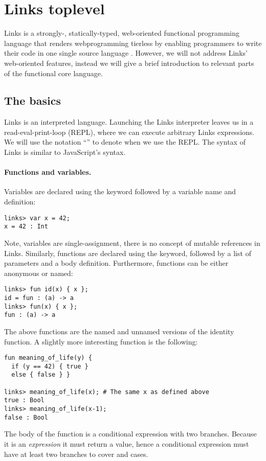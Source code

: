 \section{Links toplevel}\label{sec:links}
Links is a strongly-, statically-typed, web-oriented functional programming language that renders webprogramming tierless by enabling programmers to write their code in one single source language \cite{Cooper2006,Links}. However, we will not address Links' web-oriented features, instead we will give a brief introduction to relevant parts of the functional core language.

\subsection{The basics}
Links is an interpreted language. Launching the Links interpreter leaves us in a read-eval-print-loop (REPL), where we can execute arbitrary Links expressions. We will use the notation ``'' to denote when we use the REPL. The syntax of Links is similar to JavaScript's syntax.

\paragraph{Functions and variables.}
Variables are declared using the  keyword followed by a variable name and definition:
\begin{lstlisting}[style=links]
links> var x = 42;
x = 42 : Int
\end{lstlisting}
Note, variables are single-assignment, there is no concept of mutable references in Links.
Similarly, functions are declared using the  keyword, followed by a list of parameters and a body definition. Furthermore, functions can be either anonymous or named:
\begin{lstlisting}[style=links]
links> fun id(x) { x };
id = fun : (a) -> a
links> fun(x) { x };
fun : (a) -> a
\end{lstlisting}
The above functions are the named and unnamed versions of the identity function. A slightly more interesting function is the following:
\begin{lstlisting}[style=links]
fun meaning_of_life(y) {
  if (y == 42) { true }
  else { false } }

links> meaning_of_life(x); # The same x as defined above
true : Bool
links> meaning_of_life(x-1);
false : Bool
\end{lstlisting}
The body of the function  is a conditional expression with two branches. Because it is an \emph{expression} it must return a value, hence a conditional expression must  have at least two branches to cover  and  cases.

